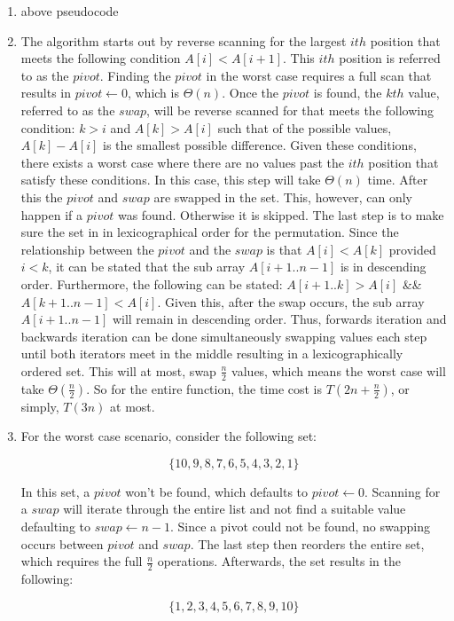 \documentclass[11pt]{article}
\begin{document}
\begin{enumerate}
\item above pseudocode
\item The algorithm starts out by reverse scanning for the largest $ith$ position that meets the following condition $A[i] < A[i+1]$. This $ith$ position is referred to as the $pivot$. Finding the $pivot$ in the worst case requires a full scan that results in $pivot \leftarrow 0$, which is $\Theta(n)$. Once the $pivot$ is found, the $kth$ value, referred to as the $swap$, will be reverse scanned for that meets the following condition: $k > i$ and $A[k] > A[i]$ such that of the possible values, $A[k] - A[i]$ is the smallest possible difference. Given these conditions, there exists a worst case where there are no values past the $ith$ position that satisfy these conditions. In this case, this step will take $\Theta(n)$ time. After this the $pivot$ and $swap$ are swapped in the set. This, however, can only happen if a $pivot$ was found. Otherwise it is skipped. The last step is to make sure the set in in lexicographical order for the permutation. Since the relationship between the $pivot$ and the $swap$ is that $A[i] < A[k]$ provided $i < k$, it can be stated that the sub array $A[i+1..n-1]$ is in descending order. Furthermore, the following can be stated: $A[i+1..k] > A[i]$ \&\& $A[k+1..n-1] < A[i]$. Given this, after the swap occurs, the sub array $A[i+1..n-1]$ will remain in descending order. Thus, forwards iteration and backwards iteration can be done simultaneously swapping values each step until both iterators meet in the middle resulting in a lexicographically ordered set. This will at most, swap $\frac{n}{2}$ values, which means the worst case will take $\Theta(\frac{n}{2})$. So for the entire function, the time cost is $T(2n + \frac{n}{2})$, or simply, $T(3n)$ at most. 
\item For the worst case scenario, consider the following set:

$$
\{ 10, 9, 8, 7, 6, 5, 4, 3, 2, 1 \}
$$

In this set, a $pivot$ won't be found, which defaults to $pivot \leftarrow 0$. Scanning for a $swap$ will iterate through the entire list and not find a suitable value defaulting to $swap \leftarrow n-1$. Since a pivot could not be found, no swapping occurs between $pivot$ and $swap$. The last step then reorders the entire set, which requires the full $\frac{n}{2}$ operations. Afterwards, the set results in the following:

$$
\{ 1, 2, 3, 4, 5, 6, 7, 8, 9, 10 \}
$$


\end{enumerate}
\end{document}
